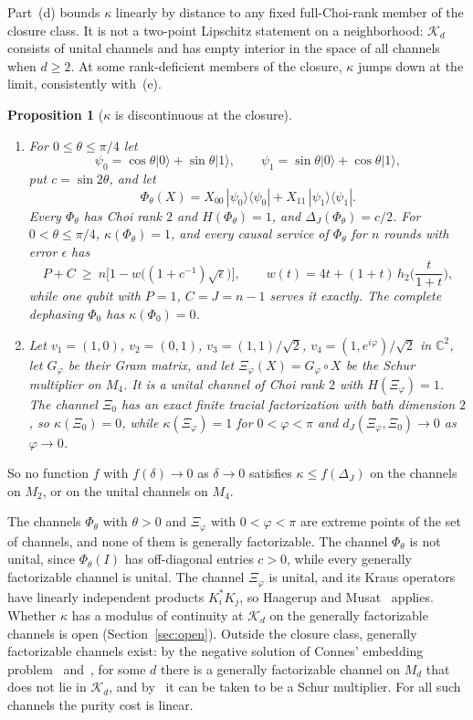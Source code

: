 \documentclass[11pt,a4paper]{article}
\theoremstyle{plain}
\newtheorem{proposition}[theorem]{Proposition}
\theoremstyle{definition}
\theoremstyle{remark}
\newcommand{\dJ}{d_J}
\begin{document}
Part~(d) bounds $\kappa$ linearly by distance to any fixed full-Choi-rank member of the closure class. It is not a two-point Lipschitz
statement on a neighborhood: $\mathcal K_d$ consists of unital channels and has empty interior in the space of all channels when $d\ge2$.
At some rank-deficient members of the closure, $\kappa$ jumps down at the limit, consistently with~(e).

\begin{proposition}[$\kappa$ is discontinuous at the closure]\label{prop:discontinuity}
\begin{enumerate}[label=(\alph*)]
\item For $0\le\theta\le\pi/4$ let
\[
\psi_0=\cos\theta|0\rangle+\sin\theta|1\rangle,\qquad\psi_1=\sin\theta|0\rangle+\cos\theta|1\rangle,
\]
put $c=\sin2\theta$, and let
\[
\Phi_\theta(X)=X_{00}\,|\psi_0\rangle\langle\psi_0|+X_{11}\,|\psi_1\rangle\langle\psi_1| .
\]
Every $\Phi_\theta$ has Choi rank $2$ and $H(\Phi_\theta)=1$, and $\Delta_J(\Phi_\theta)=c/2$. For $0<\theta\le\pi/4$, $\kappa(\Phi_\theta)=1$, and every causal
service of $\Phi_\theta$ for $n$ rounds with error $\epsilon$ has
\[
P+C\ \ge\ n\Big[1-w\big((1+c^{-1})\sqrt\epsilon\big)\Big],\qquad w(t)=4t+(1+t)\,h_2\Big(\frac t{1+t}\Big),
\]
while one qubit with $P=1$, $C=J=n-1$ serves it exactly. The complete dephasing $\Phi_0$ has $\kappa(\Phi_0)=0$.
\item Let $v_1=(1,0)$, $v_2=(0,1)$, $v_3=(1,1)/\sqrt2$, $v_4=(1,e^{i\varphi})/\sqrt2$ in $\mathbb C^2$, let $G_\varphi$ be their Gram matrix, and let
$\Xi_\varphi(X)=G_\varphi\circ X$ be the Schur multiplier on $M_4$. It is a unital channel of Choi rank $2$ with $H(\Xi_\varphi)=1$. The channel $\Xi_0$
has an exact finite tracial factorization with bath dimension $2$, so $\kappa(\Xi_0)=0$, while $\kappa(\Xi_\varphi)=1$ for $0<\varphi<\pi$ and
$\dJ(\Xi_\varphi,\Xi_0)\to0$ as $\varphi\to0$.
\end{enumerate}
\end{proposition}

So no function $f$ with $f(\delta)\to0$ as $\delta\to0$ satisfies $\kappa\le f(\Delta_J)$ on the channels on $M_2$, or on the unital channels
on $M_4$.

The channels $\Phi_\theta$ with $\theta>0$ and $\Xi_\varphi$ with $0<\varphi<\pi$ are extreme points of the set of channels, and none of them is
generally factorizable. The channel $\Phi_\theta$ is not unital, since $\Phi_\theta(I)$ has off-diagonal entries $c>0$, while every generally
factorizable channel is unital. The channel $\Xi_\varphi$
is unital, and its Kraus operators have linearly independent products $K_i^*K_j$, so Haagerup and
Musat~\cite[Corollary~2.3]{HaagerupMusat2011} applies. Whether $\kappa$ has a modulus of continuity at
$\mathcal K_d$ on the generally factorizable channels is open (Section~\ref{sec:open}). Outside the closure class, generally factorizable channels
exist: by the negative solution of Connes' embedding problem~\cite{JNVWY2020} and~\cite[Theorem~3.7]{HaagerupMusat2015}, for some $d$ there is
a generally factorizable channel on $M_d$ that does not lie in $\mathcal K_d$, and by~\cite[Corollary~3.11]{Musat2025} it can be taken to be a
Schur multiplier. For all such channels the purity cost is linear.
\end{document}
